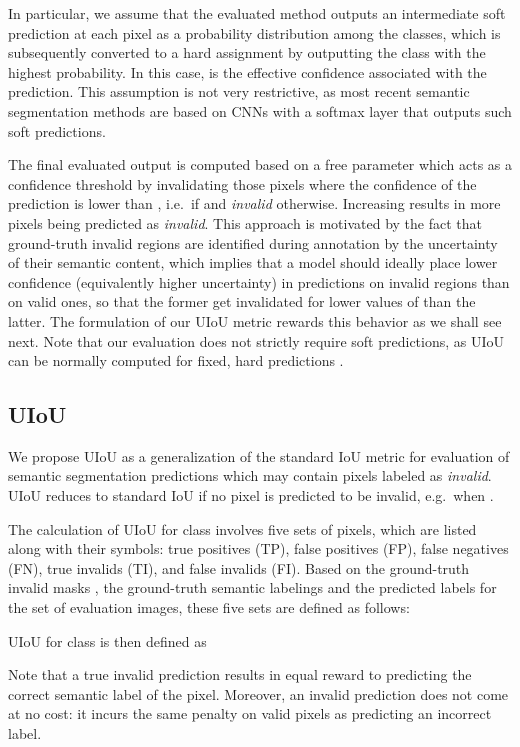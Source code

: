 \documentclass[10pt,twocolumn,letterpaper]{article}
\begin{document}
In particular, we assume that the evaluated method outputs an intermediate soft prediction  at each pixel  as a probability distribution among the  classes, which is subsequently converted to a hard assignment by outputting the class  with the highest probability. In this case,  is the effective confidence associated with the prediction. This assumption is not very restrictive, as most recent semantic segmentation methods are based on CNNs with a softmax layer that outputs such soft predictions.

The final evaluated output  is computed based on a free parameter  which acts as a confidence threshold by invalidating those pixels where the confidence of the prediction is lower than , i.e.\  if  and \emph{invalid} otherwise. Increasing  results in more pixels being predicted as \emph{invalid}. This approach is motivated by the fact that ground-truth invalid regions are identified during annotation by the uncertainty of their semantic content, which implies that a model should ideally place lower confidence (equivalently higher uncertainty) in predictions on invalid regions than on valid ones, so that the former get invalidated for lower values of  than the latter. The formulation of our UIoU metric rewards this behavior as we shall see next. Note that our evaluation does not strictly require soft predictions, as UIoU can be normally computed for fixed, hard predictions .

\subsection{UIoU}



We propose UIoU as a generalization of the standard IoU metric for evaluation of semantic segmentation predictions which may contain pixels labeled as \emph{invalid}. UIoU reduces to standard IoU if no pixel is predicted to be invalid, e.g.\ when .

The calculation of UIoU for class  involves five sets of pixels, which are listed along with their symbols: true positives (TP), false positives (FP), false negatives (FN), true invalids (TI), and false invalids (FI). Based on the ground-truth invalid masks , the ground-truth semantic labelings  and the predicted labels  for the set of evaluation images, these five sets are defined as follows:

UIoU for class  is then defined as

Note that a true invalid prediction results in equal reward to predicting the correct semantic label of the pixel. Moreover, an invalid prediction does not come at no cost: it incurs the same penalty on valid pixels as predicting an incorrect label.
\end{document}
